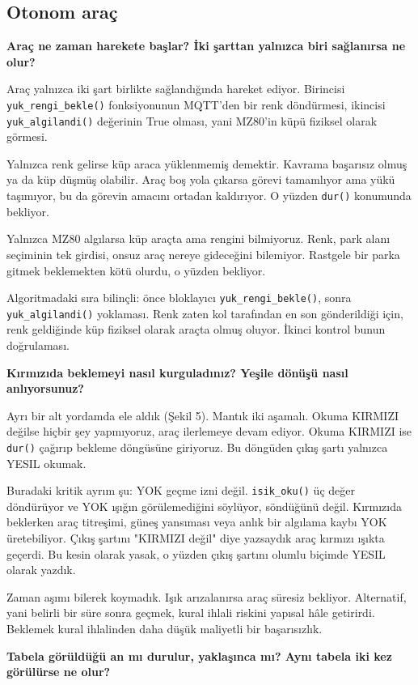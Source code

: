 \documentclass[11pt,a4paper]{article}
\newcommand{\ey}[1]{\texttt{#1}}
\begin{document}
\subsection*{Otonom araç}

\textbf{Araç ne zaman harekete başlar? İki şarttan yalnızca biri sağlanırsa ne
olur?}

Araç yalnızca iki şart birlikte sağlandığında hareket ediyor. Birincisi
\ey{yuk\_rengi\_bekle()} fonksiyonunun MQTT'den bir renk döndürmesi, ikincisi
\ey{yuk\_algilandi()} değerinin True olması, yani MZ80'in küpü fiziksel olarak
görmesi.

Yalnızca renk gelirse küp araca yüklenmemiş demektir. Kavrama başarısız olmuş
ya da küp düşmüş olabilir. Araç boş yola çıkarsa görevi tamamlıyor ama yükü
taşımıyor, bu da görevin amacını ortadan kaldırıyor. O yüzden \ey{dur()}
konumunda bekliyor.

Yalnızca MZ80 algılarsa küp araçta ama rengini bilmiyoruz. Renk, park alanı
seçiminin tek girdisi, onsuz araç nereye gideceğini bilemiyor. Rastgele bir
parka gitmek beklemekten kötü olurdu, o yüzden bekliyor.

Algoritmadaki sıra bilinçli: önce bloklayıcı \ey{yuk\_rengi\_bekle()}, sonra
\ey{yuk\_algilandi()} yoklaması. Renk zaten kol tarafından en son gönderildiği
için, renk geldiğinde küp fiziksel olarak araçta olmuş oluyor. İkinci kontrol
bunun doğrulaması.

\textbf{Kırmızıda beklemeyi nasıl kurguladınız? Yeşile dönüşü nasıl
anlıyorsunuz?}

Ayrı bir alt yordamda ele aldık (Şekil 5). Mantık iki aşamalı. Okuma KIRMIZI
değilse hiçbir şey yapmıyoruz, araç ilerlemeye devam ediyor. Okuma KIRMIZI ise
\ey{dur()} çağırıp bekleme döngüsüne giriyoruz. Bu döngüden çıkış şartı yalnızca
YESIL okumak.

Buradaki kritik ayrım şu: YOK geçme izni değil. \ey{isik\_oku()} üç değer
döndürüyor ve YOK ışığın görülemediğini söylüyor, söndüğünü değil. Kırmızıda
beklerken araç titreşimi, güneş yansıması veya anlık bir algılama kaybı YOK
üretebiliyor. Çıkış şartını "KIRMIZI değil" diye yazsaydık araç kırmızı ışıkta
geçerdi. Bu kesin olarak yasak, o yüzden çıkış şartını olumlu biçimde YESIL
olarak yazdık.

Zaman aşımı bilerek koymadık. Işık arızalanırsa araç süresiz bekliyor.
Alternatif, yani belirli bir süre sonra geçmek, kural ihlali riskini yapısal
hâle getirirdi. Beklemek kural ihlalinden daha düşük maliyetli bir başarısızlık.

\textbf{Tabela görüldüğü an mı durulur, yaklaşınca mı? Aynı tabela iki kez
görülürse ne olur?}
\end{document}
